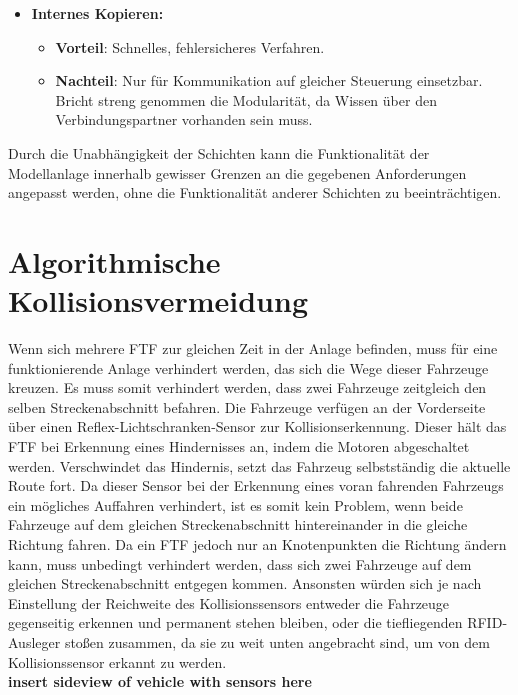 \begin{itemize}
\begin{itemize}
				\end{itemize}
			\item \textbf{Internes Kopieren:}
			\begin{itemize}
				\item \textbf{Vorteil}: Schnelles, fehlersicheres Verfahren.
				\item \textbf{Nachteil}: Nur für Kommunikation auf gleicher Steuerung einsetzbar. Bricht streng genommen die Modularität, da Wissen über den Verbindungspartner vorhanden sein muss.
			\end{itemize}
		\end{itemize}
		
		Durch die Unabhängigkeit der Schichten kann die Funktionalität der Modellanlage innerhalb gewisser Grenzen an die gegebenen Anforderungen angepasst werden, ohne die Funktionalität anderer Schichten zu beeinträchtigen.

\section{Algorithmische Kollisionsvermeidung}
	\label{Kollisionsvermeidung}
	Wenn sich mehrere \ac{FTF} zur gleichen Zeit in der Anlage befinden, muss für eine funktionierende Anlage verhindert werden, das sich die Wege dieser Fahrzeuge kreuzen. Es muss somit verhindert werden, dass zwei Fahrzeuge zeitgleich den selben Streckenabschnitt befahren.  Die Fahrzeuge verfügen an der Vorderseite über einen Reflex-Lichtschranken-Sensor zur Kollisionserkennung. Dieser hält das \ac{FTF} bei Erkennung eines Hindernisses an, indem die Motoren abgeschaltet werden. Verschwindet das Hindernis, setzt das Fahrzeug selbstständig die aktuelle Route fort. Da dieser Sensor bei der Erkennung eines voran fahrenden Fahrzeugs ein mögliches Auffahren verhindert, ist es somit kein Problem, wenn beide Fahrzeuge auf dem gleichen Streckenabschnitt hintereinander in die gleiche Richtung fahren. Da ein \ac{FTF} jedoch nur an Knotenpunkten die Richtung ändern kann, muss unbedingt verhindert werden, dass sich zwei Fahrzeuge auf dem gleichen Streckenabschnitt entgegen kommen. Ansonsten würden sich je nach Einstellung der Reichweite des Kollisionssensors entweder die Fahrzeuge gegenseitig erkennen und permanent stehen bleiben, oder die tiefliegenden \ac{RFID}-Ausleger stoßen zusammen, da sie zu weit unten angebracht sind, um von dem Kollisionssensor erkannt zu werden.\\ \textbf{insert sideview of vehicle with sensors here}
	
